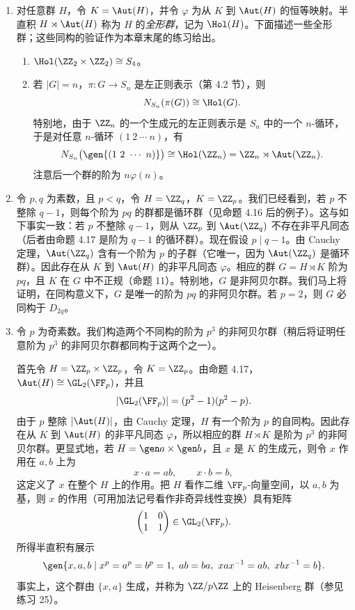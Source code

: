 \begin{enumerate}[label=(\arabic*)]
  \item 对任意群 $H$，令 $K=\Aut(H)$，并令 $\varphi$ 为从 $K$ 到 $\Aut(H)$ 的恒等映射。半直积 $H\rtimes\Aut(H)$ 称为 $H$ 的\emph{全形群}，记为 $\Hol(H)$。下面描述一些全形群；这些同构的验证作为本章末尾的练习给出。
  \begin{enumerate}[label=(\alph*)]
    \item $\Hol(\ZZ_2\times\ZZ_2)\cong S_4$。
    \item 若 $|G|=n$，$\pi:G\to S_n$ 是左正则表示（第 4.2 节），则
    \[
      N_{S_n}(\pi(G))\cong \Hol(G).
    \]
    特别地，由于 $\ZZ_n$ 的一个生成元的左正则表示是 $S_n$ 中的一个 $n$-循环，于是对任意 $n$-循环 $(1\ 2\ \cdots\ n)$，有
    \[
      N_{S_n}\bigl(\gen{(1\ 2\ \cdots\ n)}\bigr)
      \cong \Hol(\ZZ_n)=\ZZ_n\rtimes\Aut(\ZZ_n).
    \]
    注意后一个群的阶为 $n\varphi(n)$。
  \end{enumerate}

  \item 令 $p,q$ 为素数，且 $p<q$，令 $H=\ZZ_q$，$K=\ZZ_p$。我们已经看到，若 $p$ 不整除 $q-1$，则每个阶为 $pq$ 的群都是循环群（见命题 4.16 后的例子）。这与如下事实一致：若 $p$ 不整除 $q-1$，则从 $\ZZ_p$ 到 $\Aut(\ZZ_q)$ 不存在非平凡同态（后者由命题 4.17 是阶为 $q-1$ 的循环群）。现在假设 $p\mid q-1$。由 Cauchy 定理，$\Aut(\ZZ_q)$ 含有一个阶为 $p$ 的子群（它唯一，因为 $\Aut(\ZZ_q)$ 是循环群）。因此存在从 $K$ 到 $\Aut(H)$ 的非平凡同态 $\varphi$。相应的群 $G=H\rtimes K$ 阶为 $pq$，且 $K$ 在 $G$ 中不正规（命题 11）。特别地，$G$ 是非阿贝尔群。我们马上将证明，在同构意义下，$G$ 是唯一的阶为 $pq$ 的非阿贝尔群。若 $p=2$，则 $G$ 必同构于 $D_{2q}$。

  \item 令 $p$ 为奇素数。我们构造两个不同构的阶为 $p^3$ 的非阿贝尔群（稍后将证明任意阶为 $p^3$ 的非阿贝尔群都同构于这两个之一）。

  首先令 $H=\ZZ_p\times\ZZ_p$，令 $K=\ZZ_p$。由命题 4.17，$\Aut(H)\cong\GL_2(\FF_p)$，并且
  \[
    |\GL_2(\FF_p)|=(p^2-1)(p^2-p).
  \]
  由于 $p$ 整除 $|\Aut(H)|$，由 Cauchy 定理，$H$ 有一个阶为 $p$ 的自同构。因此存在从 $K$ 到 $\Aut(H)$ 的非平凡同态 $\varphi$，所以相应的群 $H\rtimes K$ 是阶为 $p^3$ 的非阿贝尔群。更显式地，若 $H=\gen a\times\gen b$，且 $x$ 是 $K$ 的生成元，则令 $x$ 作用在 $a,b$ 上为
  \[
    x\cdot a=ab,
    \qquad
    x\cdot b=b,
  \]
  这定义了 $x$ 在整个 $H$ 上的作用。把 $H$ 看作二维 $\FF_p$-向量空间，以 $a,b$ 为基，则 $x$ 的作用（可用加法记号看作非奇异线性变换）具有矩阵
  \[
    \begin{pmatrix}1&0\\1&1\end{pmatrix}\in\GL_2(\FF_p).
  \]
  所得半直积有展示
  \[
    \gen{x,a,b\mid x^p=a^p=b^p=1,
    \ ab=ba,
    \ xax^{-1}=ab,
    \ xbx^{-1}=b}.
  \]
  事实上，这个群由 $\{x,a\}$ 生成，并称为 $\ZZ/p\ZZ$ 上的 Heisenberg 群（参见练习 25）。


\end{enumerate}

